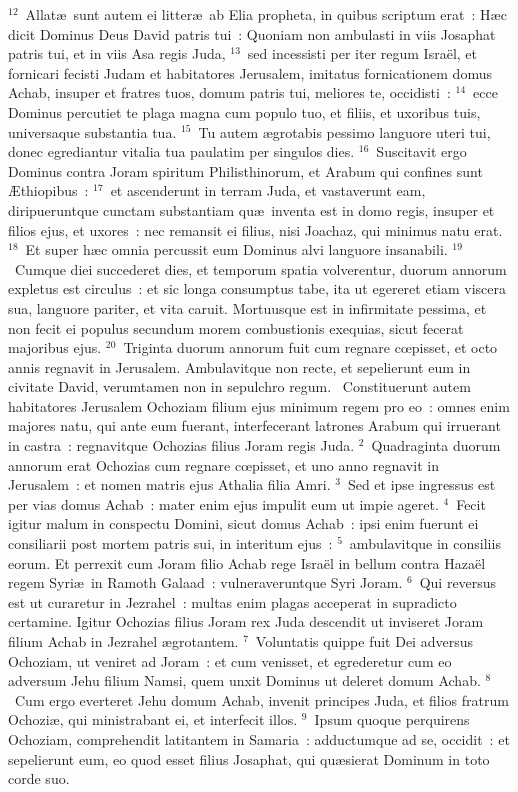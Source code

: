 ${}^{12}$~Allat\ae\ sunt autem ei litter\ae\ ab Elia propheta, in quibus scriptum erat~: H\ae c dicit Dominus Deus David patris tui~: Quoniam non ambulasti in viis Josaphat patris tui, et in viis Asa regis Juda,
${}^{13}$~sed incessisti per iter regum Isra\"el, et fornicari fecisti Judam et habitatores Jerusalem, imitatus fornicationem domus Achab, insuper et fratres tuos, domum patris tui, meliores te, occidisti~:
${}^{14}$~ecce Dominus percutiet te plaga magna cum populo tuo, et filiis, et uxoribus tuis, universaque substantia tua.
${}^{15}$~Tu autem \ae grotabis pessimo languore uteri tui, donec egrediantur vitalia tua paulatim per singulos dies.
${}^{16}$~Suscitavit ergo Dominus contra Joram spiritum Philisthinorum, et Arabum qui confines sunt \AE thiopibus~:
${}^{17}$~et ascenderunt in terram Juda, et vastaverunt eam, diripueruntque cunctam substantiam qu\ae\ inventa est in domo regis, insuper et filios ejus, et uxores~: nec remansit ei filius, nisi Joachaz, qui minimus natu erat.
${}^{18}$~Et super h\ae c omnia percussit eum Dominus alvi languore insanabili.
${}^{19}$~Cumque diei succederet dies, et temporum spatia volverentur, duorum annorum expletus est circulus~: et sic longa consumptus tabe, ita ut egereret etiam viscera sua, languore pariter, et vita caruit. Mortuusque est in infirmitate pessima, et non fecit ei populus secundum morem combustionis exequias, sicut fecerat majoribus ejus.
${}^{20}$~Triginta duorum annorum fuit cum regnare cœpisset, et octo annis regnavit in Jerusalem. Ambulavitque non recte, et sepelierunt eum in civitate David, verumtamen non in sepulchro regum.
~\lettrine[lines=10,image=true,loversize=0.05,lraise=-0.03]{C}{}onstituerunt autem habitatores Jerusalem Ochoziam filium ejus minimum regem pro eo~: omnes enim majores natu, qui ante eum fuerant, interfecerant latrones Arabum qui irruerant in castra~: regnavitque Ochozias filius Joram regis Juda.
${}^{2}$~Quadraginta duorum annorum erat Ochozias cum regnare cœpisset, et uno anno regnavit in Jerusalem~: et nomen matris ejus Athalia filia Amri.
${}^{3}$~Sed et ipse ingressus est per vias domus Achab~: mater enim ejus impulit eum ut impie ageret.
${}^{4}$~Fecit igitur malum in conspectu Domini, sicut domus Achab~: ipsi enim fuerunt ei consiliarii post mortem patris sui, in interitum ejus~:
${}^{5}$~ambulavitque in consiliis eorum. Et perrexit cum Joram filio Achab rege Isra\"el in bellum contra Haza\"el regem Syri\ae\ in Ramoth Galaad~: vulneraveruntque Syri Joram.
${}^{6}$~Qui reversus est ut curaretur in Jezrahel~: multas enim plagas acceperat in supradicto certamine. Igitur Ochozias filius Joram rex Juda descendit ut inviseret Joram filium Achab in Jezrahel \ae grotantem.
${}^{7}$~Voluntatis quippe fuit Dei adversus Ochoziam, ut veniret ad Joram~: et cum venisset, et egrederetur cum eo adversum Jehu filium Namsi, quem unxit Dominus ut deleret domum Achab.
${}^{8}$~Cum ergo everteret Jehu domum Achab, invenit principes Juda, et filios fratrum Ochozi\ae , qui ministrabant ei, et interfecit illos.
${}^{9}$~Ipsum quoque perquirens Ochoziam, comprehendit latitantem in Samaria~: adductumque ad se, occidit~: et sepelierunt eum, eo quod esset filius Josaphat, qui qu\ae sierat Dominum in toto corde suo.

